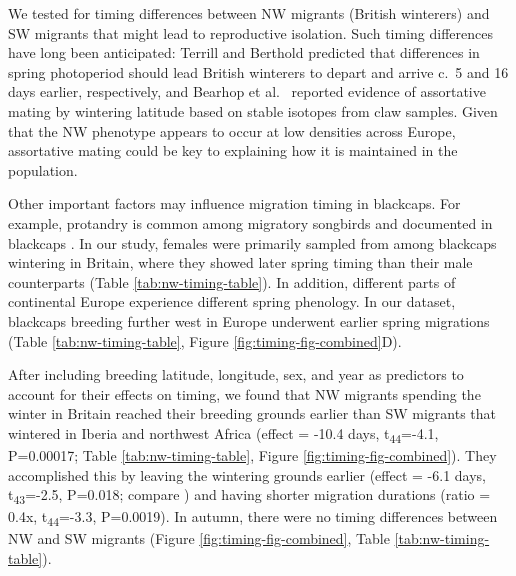 \documentclass[a4paper, twoside]{templates/ociamthesis}
\begin{document}
We tested for timing differences between NW migrants (British winterers) and SW migrants that might lead to reproductive isolation.
Such timing differences have long been anticipated: Terrill and Berthold \autocite{terrillEcophysiologicalAspectsRapid1990} predicted that differences in spring photoperiod should lead British winterers to depart and arrive c.~5 and 16 days earlier, respectively, and Bearhop et al.~\autocite{bearhopAssortativeMatingMechanism2005} reported evidence of assortative mating by wintering latitude based on stable isotopes from claw samples.
Given that the NW phenotype appears to occur at low densities across Europe, assortative mating could be key to explaining how it is maintained in the population.

Other important factors may influence migration timing in blackcaps.
For example, protandry is common among migratory songbirds and documented in blackcaps \autocite{rainioEffectsClimateChange2007}.
In our study, females were primarily sampled from among blackcaps wintering in Britain, where they showed later spring timing than their male counterparts (Table \ref{tab:nw-timing-table}).
In addition, different parts of continental Europe experience different spring phenology.
In our dataset, blackcaps breeding further west in Europe underwent earlier spring migrations (Table \ref{tab:nw-timing-table}, Figure \ref{fig:timing-fig-combined}D).

After including breeding latitude, longitude, sex, and year as predictors to account for their effects on timing, we found that NW migrants spending the winter in Britain reached their breeding grounds earlier than SW migrants that wintered in Iberia and northwest Africa (effect = -10.4 days, t\textsubscript{44}=-4.1, P=0.00017; Table \ref{tab:nw-timing-table}, Figure \ref{fig:timing-fig-combined}).
They accomplished this by leaving the wintering grounds earlier
(effect = -6.1 days, t\textsubscript{43}=-2.5, P=0.018; compare \autocite{terrillEcophysiologicalAspectsRapid1990}) and having shorter migration durations (ratio = 0.4x, t\textsubscript{44}=-3.3, P=0.0019).
In autumn, there were no timing differences between NW and SW migrants (Figure \ref{fig:timing-fig-combined}, Table \ref{tab:nw-timing-table}).
\end{document}
